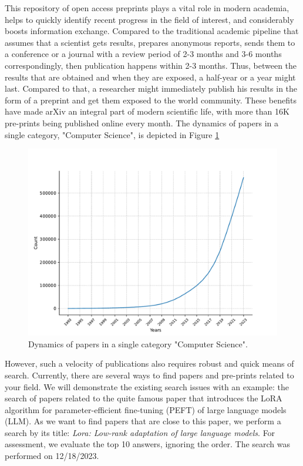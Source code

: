 \documentclass{article}
\begin{document}
    This repository of open access preprints plays a vital role in modern academia, helps to quickly identify recent progress in the field of interest, and considerably boosts information exchange. Compared to the traditional academic pipeline that assumes that a scientist gets results, prepares anonymous reports, sends them to a conference or a journal with a review period of 2-3 months and 3-6 months correspondingly, then publication happens within 2-3 months. Thus, between the results that are obtained and when they are exposed, a half-year or a year might last. Compared to that, a researcher might immediately publish his results in the form of a preprint and get them exposed to the world community. These benefits have made arXiv an integral part of modern scientific life, with more than 16K pre-prints being published online every month. The dynamics of papers in a single category, "Computer Science", is depicted in Figure \ref{fig:cumulative}

    \begin{figure}[H]
        \centering
        \includegraphics[width=0.99\linewidth]{img/number_of_articles_in_years.pdf}
        \caption{Dynamics of papers in a single category "Computer Science".}
        \label{fig:cumulative}
    \end{figure}
    
    However, such a velocity of publications also requires robust and quick means of search. Currently, there are several ways to find papers and pre-prints related to your field. We will demonstrate the existing search issues with an example: the search of papers related to the quite famous paper \cite{hu2021lora} that introduces the LoRA algorithm for parameter-efficient fine-tuning (PEFT) of large language models (LLM). As we want to find papers that are close to this paper, we perform a search by its title: \textit{Lora: Low-rank adaptation of large language models}. For assessment, we evaluate the top 10 answers, ignoring the order. The search was performed on 12/18/2023.
    
\end{document}
